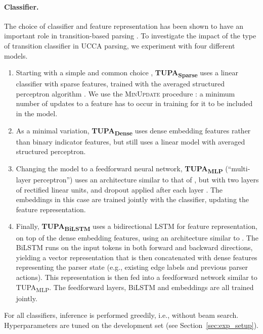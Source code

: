 \documentclass[11pt,a4paper]{article}
\newcommand{\parser}[1]{TUPA\textsubscript{#1}}
\newcommand{\secref}[1]{Section~\ref{#1}}
\begin{document}
\paragraph{Classifier.}
The choice of classifier and feature representation has been shown to have an important role in
transition-based parsing \cite{chen2014fast,andor2016globally,kiperwasser2016simple}.
To investigate the impact of the type of transition classifier in UCCA parsing,
we experiment with four different models.
\begin{enumerate}
\item
Starting with a simple and common choice \cite[e.g.,][]{maier-lichte:2016:DiscoNLP},
\textbf{\parser{Sparse}} uses a linear classifier with sparse features, trained with
the averaged structured perceptron algorithm
\cite{Coll:04}. We use the \textsc{MinUpdate} procedure \cite{goldberg2011learning}:
a minimum number of updates to a feature has to occur in training for it
to be included in the model.
\item
As a minimal variation, \textbf{\parser{Dense}} uses dense embedding features rather than binary indicator
features, but still uses a linear model with averaged structured perceptron.
\item
Changing the model to a feedforward neural network, \textbf{\parser{MLP}}
(``multi-layer perceptron'') uses an architecture similar to that of \citet{chen2014fast},
but with two layers of rectified linear units,
and dropout applied after each layer \cite{srivastava2014dropout}.
The embeddings in this case are trained jointly with the classifier,
updating the feature representation.
\item
Finally, \textbf{\parser{BiLSTM}} uses a bidirectional LSTM for feature representation,
on top of the dense embedding features,
using an architecture similar to \citet{kiperwasser2016simple}.
The BiLSTM runs on the input tokens in both forward and backward directions,
yielding a vector representation that is then concatenated with dense features representing the
parser state (e.g., existing edge labels and previous parser actions).
This representation is then fed into a feedforward network similar to \parser{MLP}.
The feedforward layers, BiLSTM and embeddings are all trained jointly.
\end{enumerate}

For all classifiers, inference is performed greedily, i.e., without beam search.
Hyperparameters are tuned on the development set (see \secref{sec:exp_setup}).
\end{document}
